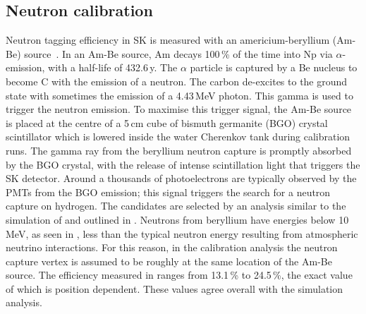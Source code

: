 
\subsection{Neutron calibration}


Neutron tagging efficiency in SK is measured with an americium-beryllium (Am-Be) source~\cite{Watanabe:2008ru}.
In an Am-Be source, Am decays 100\,\% of the time into Np via $\alpha$-emission, %
with a half-life of 432.6\,y.
The $\alpha$ particle is captured by a Be nucleus to become C\tapi{*} with the emission of a neutron.
The carbon de-excites to the ground state with sometimes the emission of a 4.43\,MeV photon.
This gamma is used to trigger the neutron emission.
To maximise this trigger signal, the Am-Be source is placed at the centre of a 5\,cm cube of %
bismuth germanite (BGO) crystal scintillator which is lowered inside the water Cherenkov tank during calibration runs.
The gamma ray from the beryllium neutron capture is promptly absorbed by the BGO crystal, %
with the release of intense scintillation light that triggers the SK detector. 
Around a thousands of photoelectrons are typically observed by the PMTs from the BGO emission; %
this signal triggers the search for a neutron capture on hydrogen.
The candidates are selected by an analysis similar to the simulation of  and outlined in .
Neutrons from beryllium have energies below 10\,MeV, as seen in , %
less than the typical neutron energy resulting from atmospheric neutrino interactions.
For this reason, in the calibration analysis the neutron capture vertex is assumed to be roughly at the same location %
of the Am-Be source.
The efficiency measured in  ranges from 13.1\,\% to 24.5\,\%, %
the exact value of which is position dependent.
These values agree overall with the simulation analysis.

